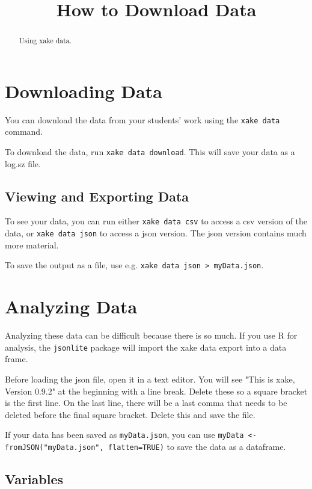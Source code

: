 \documentclass{ximera}
\title{How to Download Data}
\begin{document}
\begin{abstract}
  Using xake data.
\end{abstract}
\maketitle

\section{Downloading Data}

You can download the data from your students' work using the \verb!xake data! command.

To download the data, run \verb!xake data download!. This will save your data as a log.sz file.

\subsection{Viewing and Exporting Data}

To see your data, you can run either \verb!xake data csv! to access a csv version of the data, or \verb!xake data json! to access a json version. The json version contains much more material.

To save the output as a file, use e.g. \verb!xake data json > myData.json!.

\section{Analyzing Data}

Analyzing these data can be difficult because there is so much. If you use R for analysis, the \verb!jsonlite! package will import the xake data export into a data frame.

Before loading the json file, open it in a text editor. You will see "This is xake, Version 0.9.2" at the beginning with a line break. Delete these so a square bracket is the first line. On the last line, there will be a last comma that needs to be deleted before the final square bracket. Delete this and save the file.

If your data has been saved as \verb!myData.json!, you can use \verb!myData <- fromJSON("myData.json", flatten=TRUE)! to save the data as a dataframe.

\subsection{Variables}
\end{document}
